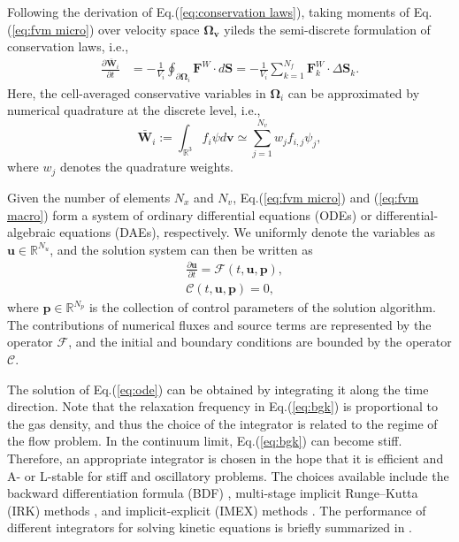 \documentclass[preprint,3p,12pt,sort&compress]{elsarticle}
\begin{document}
Following the derivation of Eq.(\ref{eq:conservation laws}), taking moments of Eq.(\ref{eq:fvm micro}) over velocity space $\mathbf \Omega_{\mathbf v}$ yileds the semi-discrete formulation of conservation laws, i.e.,
\begin{equation}
\begin{aligned}
    \frac{\partial \bar{\mathbf W}_{i}}{\partial t} &= -\frac{1}{V_{i}} \oint_{\partial \mathbf \Omega_i} \mathbf F^W \cdot d\mathbf S = -\frac{1}{V_{i}} \sum_{k=1}^{N_f} \mathbf F_{k}^W \cdot \Delta \mathbf S_k.
\end{aligned}
\label{eq:fvm macro}
\end{equation}
Here, the cell-averaged conservative variables in $\mathbf \Omega_{i}$ can be approximated by numerical quadrature at the discrete level, i.e.,
\begin{equation}
    \bar{\mathbf W}_{i} := \int_{\mathbb R^3} f_{i} \psi d \mathbf{v} \simeq \sum_{j=1}^{N_{v}} w_j f_{i,j} \psi_j,
\end{equation}
where $w_j$ denotes the quadrature weights.

Given the number of elements $N_{x}$ and $N_{v}$, Eq.(\ref{eq:fvm micro}) and (\ref{eq:fvm macro}) form a system of ordinary differential equations (ODEs) or differential-algebraic equations (DAEs), respectively.
We uniformly denote the variables as $\mathbf u \in \mathbb R^{N_{u}}$, and the solution system can then be written as
\begin{equation}
\begin{aligned}
    &\frac{\partial \mathbf u}{\partial t}=\mathcal F(t,\mathbf u,\mathbf p), \\
    &\mathcal C(t,\mathbf u,\mathbf p)=0,
\end{aligned}
\label{eq:ode}
\end{equation}
where $\mathbf p\in\mathbb R^{N_{p}}$ is the collection of control parameters of the solution algorithm.
The contributions of numerical fluxes and source terms are represented by the operator $\mathcal F$, and the initial and boundary conditions are bounded by the operator $\mathcal C$.

The solution of Eq.(\ref{eq:ode}) can be obtained by integrating it along the time direction.
Note that the relaxation frequency in Eq.(\ref{eq:bgk}) is proportional to the gas density, and thus the choice of the integrator is related to the regime of the flow problem.
In the continuum limit, Eq.(\ref{eq:bgk}) can become stiff.
Therefore, an appropriate integrator is chosen in the hope that it is efficient and A- or L-stable for stiff and oscillatory problems.
The choices available include the backward differentiation formula (BDF) \cite{brayton1972new}, multi-stage implicit Runge–Kutta (IRK) methods \cite{jameson2017evaluation}, and implicit-explicit (IMEX) methods \cite{ascher1995implicit}.
The performance of different integrators for solving kinetic equations is briefly summarized in \cite{xiao2021flux}.
\end{document}
